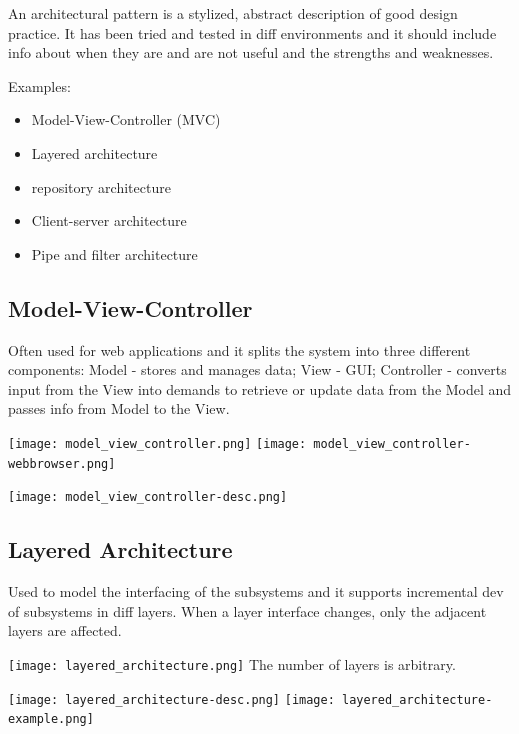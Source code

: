 \documentclass{article}
\begin{document}
    An architectural pattern is a stylized, abstract description of good design practice. 
    It has been tried and tested in diff environments and it should include info about 
    when they are and are not useful and the strengths and weaknesses.

    Examples:
    \begin{itemize}
        \item Model-View-Controller (MVC)
        \item Layered architecture 
        \item repository architecture 
        \item Client-server architecture 
        \item Pipe and filter architecture
    \end{itemize}

    \subsection*{Model-View-Controller}

    Often used for web applications and it splits the system into three different 
    components: Model - stores and manages data; View - GUI; Controller - 
    converts input from the View into demands to retrieve or update data from the 
    Model and passes info from Model to the View.

    \texttt{[image: model\_view\_controller.png]}
    \texttt{[image: model\_view\_controller-webbrowser.png]}
    \begin{center}
        \texttt{[image: model\_view\_controller-desc.png]}
    \end{center}

    \subsection*{Layered Architecture}    

    Used to model the interfacing of the subsystems and it supports incremental dev 
    of subsystems in diff layers. When a layer interface changes, only the adjacent layers
    are affected. 

    \begin{center}
        \texttt{[image: layered\_architecture.png]}
        The number of layers is arbitrary.

        \texttt{[image: layered\_architecture-desc.png]}
        \texttt{[image: layered\_architecture-example.png]}
    \end{center}
\end{document}
